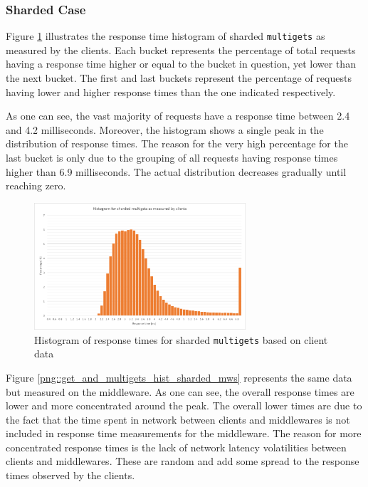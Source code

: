 \documentclass[11pt,a4paper]{article}
\begin{document}
\subsubsection{Sharded Case}
Figure \ref{png::get_and_multigets_hist_sharded_clients} illustrates the response time histogram of sharded \texttt{multigets} as measured by the clients. Each bucket represents the percentage of total requests having a response time higher or equal to the bucket in question, yet lower than the next bucket. The first and last buckets represent the percentage of requests having lower and higher response times than the one indicated respectively.

As one can see, the vast majority of requests have a response time between 2.4 and 4.2 milliseconds. Moreover, the histogram shows a single peak in the distribution of response times. The reason for the very high percentage for the last bucket is only due to the grouping of all requests having response times higher than 6.9 milliseconds. The actual distribution decreases gradually until reaching zero.

\begin{figure}[!h]
    \centering
    \includegraphics[width=0.7\textwidth]{processing/graphics/get_and_multigets_hist_sharded_clients.png}
    \caption{Histogram of response times for sharded \texttt{multigets} based on client data}
    \label{png::get_and_multigets_hist_sharded_clients}
\end{figure}

Figure \ref{png::get_and_multigets_hist_sharded_mws} represents the same data but measured on the middleware. As one can see, the overall response times are lower and more concentrated around the peak. The overall lower times are due to the fact that the time spent in network between clients and middlewares is not included in response time measurements for the middleware. The reason for more concentrated response times is the lack of network latency volatilities between clients and middlewares. These are random and add some spread to the response times observed by the clients.
\end{document}
